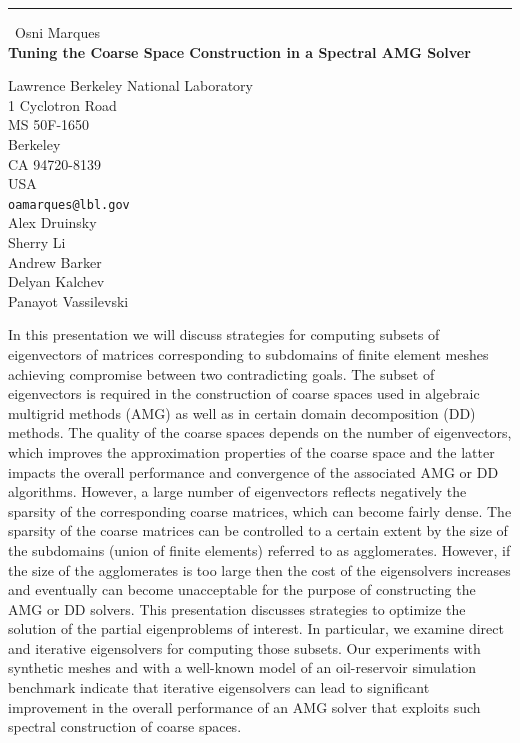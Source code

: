 \documentclass{report}
\begin{document}
\begin{center}
\rule{6in}{1pt} \
{\large Osni Marques \\
{\bf Tuning the Coarse Space Construction in a Spectral AMG Solver}}

Lawrence Berkeley National Laboratory \\ 1 Cyclotron Road \\ MS 50F-1650 \\ Berkeley \\ CA 94720-8139 \\ USA
\\
{\tt oamarques@lbl.gov}\\
Alex  Druinsky\\
Sherry  Li\\
Andrew Barker\\
Delyan Kalchev\\
Panayot Vassilevski\\
	
	     \end{center}

In this presentation we will discuss strategies for computing subsets of
eigenvectors of matrices corresponding to subdomains
of finite element meshes achieving compromise between two contradicting
goals. The subset of eigenvectors is required in the construction of
coarse spaces used in algebraic multigrid methods (AMG) as well as in
certain domain decomposition (DD) methods. The quality of the coarse
spaces depends on the number of eigenvectors, which improves the
approximation properties of the coarse space and the latter impacts the
overall performance and convergence of the associated AMG or DD
algorithms. However, a large number of eigenvectors reflects negatively
the sparsity of the corresponding coarse matrices, which can become
fairly dense. The sparsity of the coarse matrices can be controlled to a
certain extent by the size of the subdomains (union of finite elements)
referred to as agglomerates. However, if the size of the agglomerates is
too large then the cost of the eigensolvers increases and eventually can
become unacceptable for the purpose of constructing the AMG or DD
solvers. This presentation discusses strategies to optimize the solution
of the partial eigenproblems of interest. In particular, we examine
direct and iterative eigensolvers for computing those subsets. Our
experiments with synthetic meshes and with a well-known model of an
oil-reservoir simulation benchmark indicate that iterative eigensolvers
can lead to significant improvement in the overall performance of an AMG
solver that exploits such spectral construction of coarse spaces.
\end{document}
